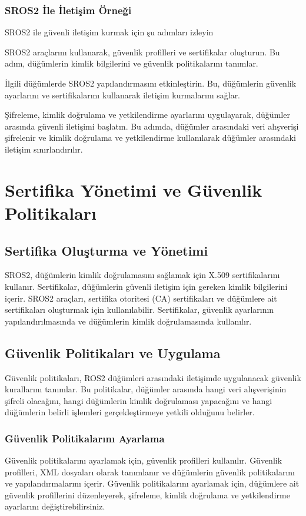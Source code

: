 \subsubsection{SROS2 İle İletişim Örneği}
SROS2 ile güvenli iletişim kurmak için şu adımları izleyin

SROS2 araçlarını kullanarak, güvenlik profilleri ve sertifikalar oluşturun. Bu adım, düğümlerin kimlik bilgilerini ve güvenlik politikalarını tanımlar.

İlgili düğümlerde SROS2 yapılandırmasını etkinleştirin. Bu, düğümlerin güvenlik ayarlarını ve sertifikalarını kullanarak iletişim kurmalarını sağlar.

Şifreleme, kimlik doğrulama ve yetkilendirme ayarlarını uygulayarak, düğümler arasında güvenli iletişimi başlatın. Bu adımda, düğümler arasındaki veri alışverişi şifrelenir ve kimlik doğrulama ve yetkilendirme kullanılarak düğümler arasındaki iletişim sınırlandırılır.

\section{Sertifika Yönetimi ve Güvenlik Politikaları}
\subsection{Sertifika Oluşturma ve Yönetimi}
SROS2, düğümlerin kimlik doğrulamasını sağlamak için X.509 sertifikalarını kullanır. Sertifikalar, düğümlerin güvenli iletişim için gereken kimlik bilgilerini içerir. SROS2 araçları, sertifika otoritesi (CA) sertifikaları ve düğümlere ait sertifikaları oluşturmak için kullanılabilir. Sertifikalar, güvenlik ayarlarının yapılandırılmasında ve düğümlerin kimlik doğrulamasında kullanılır.

\subsection{Güvenlik Politikaları ve Uygulama}
Güvenlik politikaları, ROS2 düğümleri arasındaki iletişimde uygulanacak güvenlik kurallarını tanımlar. Bu politikalar, düğümler arasında hangi veri alışverişinin şifreli olacağını, hangi düğümlerin kimlik doğrulaması yapacağını ve hangi düğümlerin belirli işlemleri gerçekleştirmeye yetkili olduğunu belirler.

\subsubsection{Güvenlik Politikalarını Ayarlama}
Güvenlik politikalarını ayarlamak için, güvenlik profilleri kullanılır. Güvenlik profilleri, XML dosyaları olarak tanımlanır ve düğümlerin güvenlik politikalarını ve yapılandırmalarını içerir. Güvenlik politikalarını ayarlamak için, düğümlere ait güvenlik profillerini düzenleyerek, şifreleme, kimlik doğrulama ve yetkilendirme ayarlarını değiştirebilirsiniz.

